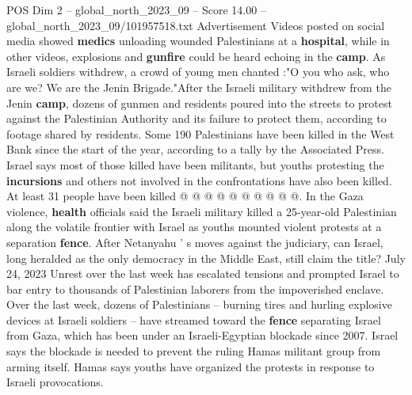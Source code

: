 \begin{textsample}{POS Dim 2 – global\_north\_2023\_09 – Score 14.00 – global\_north\_2023\_09/101957518.txt}
Advertisement Videos posted on social media showed \textbf{medics} unloading wounded Palestinians at a \textbf{hospital}, while in other videos, explosions and \textbf{gunfire} could be heard echoing in the \textbf{camp}.
As Israeli soldiers withdrew, a crowd of young men chanted :"O you who ask, who are we?
We are the Jenin Brigade."After the Israeli military withdrew from the Jenin \textbf{camp}, dozens of gunmen and residents poured into the streets to protest against the Palestinian Authority and its failure to protect them, according to footage shared by residents.
Some 190 Palestinians have been killed in the West Bank since the start of the year, according to a tally by the Associated Press.
Israel says most of those killed have been militants, but youths protesting the \textbf{incursions} and others not involved in the confrontations have also been killed.
At least 31 people have been killed @ @ @ @ @ @ @ @ @ @.
In the Gaza violence, \textbf{health} officials said the Israeli military killed a 25-year-old Palestinian along the volatile frontier with Israel as youths mounted violent protests at a separation \textbf{fence}.
After Netanyahu ' s moves against the judiciary, can Israel, long heralded as the only democracy in the Middle East, still claim the title?
July 24, 2023 Unrest over the last week has escalated tensions and prompted Israel to bar entry to thousands of Palestinian laborers from the impoverished enclave.
Over the last week, dozens of Palestinians -- burning tires and hurling explosive devices at Israeli soldiers -- have streamed toward the \textbf{fence} separating Israel from Gaza, which has been under an Israeli-Egyptian blockade since 2007.
Israel says the blockade is needed to prevent the ruling Hamas militant group from arming itself.
Hamas says youths have organized the protests in response to Israeli provocations.

\end{textsample}
